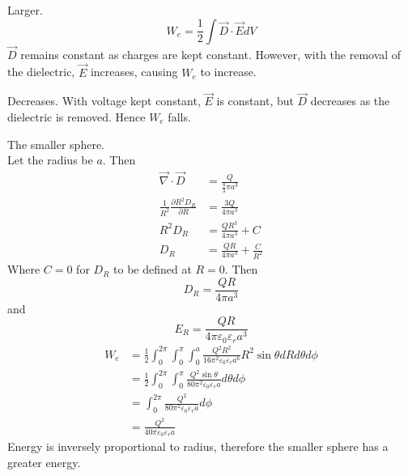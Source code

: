 \documentclass[answers]{exam}
\begin{document}
\begin{questions}
\begin{solution}
	Larger.
	$$W_e = \frac{1}{2} \int \vec{D} \cdot \vec{E}dV$$
	$\vec{D}$ remains constant as charges are kept constant. However, with the removal of the dielectric, $\vec{E}$ increases, causing $W_e$ to increase.
\end{solution}


\begin{solution}
	Decreases. With voltage kept constant, $\vec{E}$ is constant, but $\vec{D}$ decreases as the dielectric is removed. Hence $W_e$ falls.
\end{solution}


\begin{solution}
	The smaller sphere. \\
	Let the radius be $a$. Then
	\begin{align*}
		\vec{\nabla}\cdot \vec{D} &= \frac{Q}{\frac{4}{3}\pi a^3} \\
		\frac{1}{R^2}\frac{\partial R^2 D_R}{\partial R} &= \frac{3Q}{4\pi a^3} \\
		R^2 D_R &= \frac{QR^3}{4\pi a^3} + C \\
		D_R &= \frac{QR}{4\pi a^3} + \frac{C}{R^2}
	\end{align*}
	Where $C=0$ for $D_R$ to be defined at $R=0$. Then
	$$D_R = \frac{QR}{4\pi a^3}$$
	and
	$$E_R = \frac{QR}{4\pi \varepsilon_0\varepsilon_r a^3}$$
	\begin{align*}
		W_e &= \frac{1}{2} \int_0^{2\pi} \int_0^\pi \int_0^a \frac{Q^2R^2}{16\pi^2 \varepsilon_0\varepsilon_r a^6} R^2\sin\theta dR d\theta d\phi \\
		    &= \frac{1}{2} \int_0^{2\pi} \int_0^\pi \frac{Q^2\sin\theta}{80\pi^2\varepsilon_0\varepsilon_r a} d\theta d\phi \\
		    &= \int_0^{2\pi} \frac{Q^2}{80\pi^2\varepsilon_0\varepsilon_r a} d\phi \\
		    &= \frac{Q^2}{40\pi\varepsilon_0\varepsilon_r a}
	\end{align*}
	Energy is inversely proportional to radius, therefore the smaller sphere has a greater energy.
\end{solution}


\end{questions}
\end{document}
